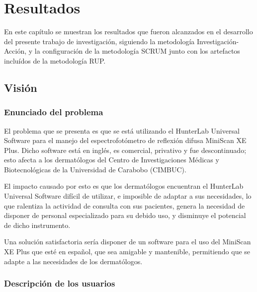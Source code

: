 \chapter{Resultados}

En este cap\'{i}tulo se muestran los resultados que fueron alcanzados en el desarrollo del presente trabajo de investigaci\'{o}n, siguiendo la metodolog\'{i}a Investigaci\'{o}n-Acci\'{o}n, y la configuraci\'{o}n de la metodolog\'{i}a SCRUM junto con los artefactos inclu\'{i}dos de la metodolog\'{i}a RUP.

\section{Visi\'{o}n}
	
	\subsection{Enunciado del problema}
	
	El problema que se presenta es que se est\'{a} utilizando el HunterLab Universal Software para el manejo del espectrofot\'{o}metro de reflexi\'{o}n difusa MiniScan XE Plus. Dicho software est\'{a} en ingl\'{e}s, es comercial, privativo y fue descontinuado; esto afecta a los dermat\'{o}logos del Centro de Investigaciones M\'{e}dicas y Biotecnol\'{o}gicas de la Universidad de Carabobo (CIMBUC).
	
	El impacto causado por esto es que los dermat\'{o}logos encuentran el HunterLab Universal Software dif\'{i}cil de utilizar, e imposible de adaptar a sus necesidades, lo que ralentiza la actividad de consulta con sus pacientes, genera la necesidad de disponer de personal especializado para su debido uso, y disminuye el potencial de dicho instrumento.
	
	Una soluci\'{o}n satisfactoria ser\'{i}a disponer de un software para el uso del \mbox{MiniScan} XE Plus que est\'{e} en espa\~{n}ol, que sea amigable y mantenible, permitiendo que se adapte a las necesidades de los dermat\'{o}logos.
	
	\subsection{Descripci\'{o}n de los usuarios}
	
